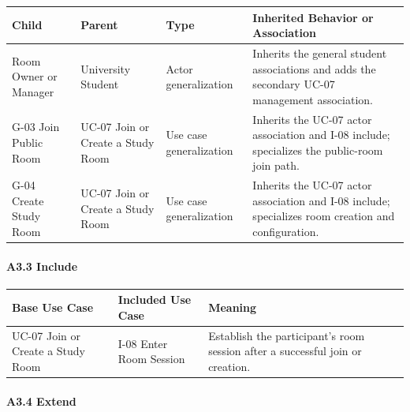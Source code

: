 \documentclass[12pt]{article}
\renewcommand{\baselinestretch}{1.5}
\begin{document}
\begingroup
\small
\renewcommand{\baselinestretch}{1.0}\selectfont
\renewcommand{\arraystretch}{1.15}
\setlength{\tabcolsep}{6pt}
\begin{longtable}{|>{\raggedright\arraybackslash}p{}|>{\raggedright\arraybackslash}p{}|>{\raggedright\arraybackslash}p{}|>{\raggedright\arraybackslash}p{}|}
\hline
\textbf{Child} & \textbf{Parent} & \textbf{Type} & \textbf{Inherited Behavior or Association} \\ \hline
\endhead
Room Owner or Manager & University Student & Actor generalization & Inherits the general student associations and adds the secondary UC-07 management association. \\ \hline
G-03 Join Public Room & UC-07 Join or Create a Study Room & Use case generalization & Inherits the UC-07 actor association and I-08 include; specializes the public-room join path. \\ \hline
G-04 Create Study Room & UC-07 Join or Create a Study Room & Use case generalization & Inherits the UC-07 actor association and I-08 include; specializes room creation and configuration. \\ \hline
\end{longtable}
\endgroup
\par\medskip

\hypertarget{sec:a3-3-include}{}
\paragraph*{A3.3 Include}
\par\medskip

\begingroup
\small
\renewcommand{\baselinestretch}{1.0}\selectfont
\renewcommand{\arraystretch}{1.15}
\setlength{\tabcolsep}{6pt}
\begin{longtable}{|>{\raggedright\arraybackslash}p{}|>{\raggedright\arraybackslash}p{}|>{\raggedright\arraybackslash}p{}|}
\hline
\textbf{Base Use Case} & \textbf{Included Use Case} & \textbf{Meaning} \\ \hline
\endhead
UC-07 Join or Create a Study Room & I-08 Enter Room Session & Establish the participant's room session after a successful join or creation. \\ \hline
\end{longtable}
\endgroup
\par\medskip

\hypertarget{sec:a3-4-extend}{}
\paragraph*{A3.4 Extend}
\par\medskip
\end{document}
